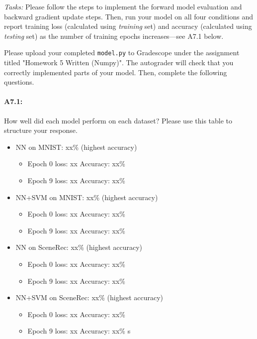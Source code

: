 \emph{Tasks:} Please follow the steps to implement the forward model evaluation and backward gradient update steps. Then, run your model on all four conditions and report training loss (calculated using \emph{training} set) and accuracy (calculated using \emph{testing} set) as the number of training epochs increases---see A7.1 below.


Please upload your completed \texttt{model.py} to Gradescope under the assignment titled "Homework 5 Written (Numpy)". The autograder will check that you correctly implemented parts of your model. Then, complete the following questions.

\paragraph{A7.1:}

How well did each model perform on each dataset? Please use this table to structure your response.

    \begin{itemize}
        \item NN on MNIST: xx\% (highest accuracy)
        	\begin{itemize}
        	\item Epoch 0 loss: xx     Accuracy: xx\%
        	\item Epoch 9 loss: xx     Accuracy: xx\%
        	\end{itemize}
        \item NN+SVM on MNIST: xx\% (highest accuracy)
        	\begin{itemize}
        	\item Epoch 0 loss: xx     Accuracy: xx\%
        	\item Epoch 9 loss: xx     Accuracy: xx\%
        	\end{itemize}
        \item NN on SceneRec: xx\% (highest accuracy)
        	\begin{itemize}
        	\item Epoch 0 loss: xx     Accuracy: xx\%
        	\item Epoch 9 loss: xx     Accuracy: xx\%
        	\end{itemize}
        \item NN+SVM on SceneRec: xx\% (highest accuracy)
        	\begin{itemize}
        	\item Epoch 0 loss: xx     Accuracy: xx\%
        	\item Epoch 9 loss: xx     Accuracy: xx\%
    	    s\end{itemize}
    \end{itemize}


